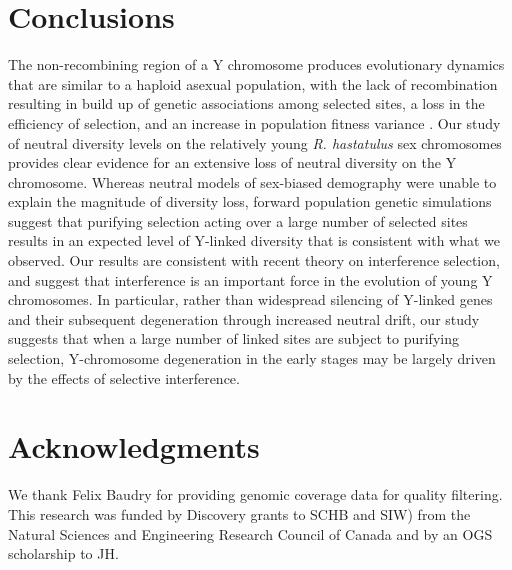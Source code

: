 \documentclass[9pt,twocolumn,twoside]{gsajnl}
\begin{document}
\section*{Conclusions}
The non-recombining region of a Y chromosome produces evolutionary dynamics that are similar to a haploid asexual population, with the lack of recombination resulting in build up of genetic associations among selected sites, a loss in the efficiency of selection, and an increase in population fitness variance \citep{fisher1930genetical, muller1964relation, hill1966HReffect, mcvean2000,KaiserCharlesworth,good2014genetic}. Our study of neutral diversity levels on the relatively young \textit{R. hastatulus} sex chromosomes provides clear evidence for an extensive loss of neutral diversity on the Y chromosome. Whereas neutral models of sex-biased demography were unable to explain the magnitude of diversity loss, forward population genetic simulations suggest that purifying selection acting over a large number of selected sites results in an expected level of Y-linked diversity that is consistent with what we observed. Our results are consistent with recent theory on interference selection, and suggest that interference is an important force in the evolution of  young Y chromosomes. In particular, rather than widespread silencing of Y-linked genes and their subsequent degeneration through increased neutral drift, our study suggests that when a large number of linked sites are subject to purifying selection, Y-chromosome degeneration in the early stages may be largely driven by the effects of selective interference.

\section*{Acknowledgments}
We thank Felix Baudry for providing genomic coverage data for quality filtering. This research was funded by Discovery grants to SCHB and SIW) from the Natural Sciences and Engineering Research Council of Canada and by an OGS scholarship to JH.

\end{document}
